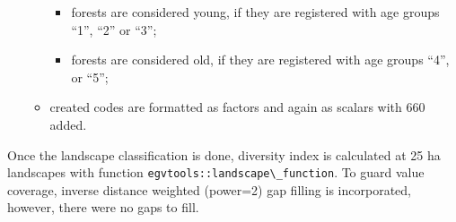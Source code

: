 \documentclass[
]{book}
\newcommand{\passthrough}[1]{#1}
\begin{document}
\begin{itemize}
\begin{itemize}
    \begin{itemize}
    \item
      forests are considered young, if they are registered with age groups
      ``1'', ``2'' or ``3'';
    \item
      forests are considered old, if they are registered with age groups
      ``4'', or ``5'';
    \end{itemize}
  \item
    created codes are formatted as factors and again as scalars with 660 added.
  \end{itemize}
\end{itemize}

Once the landscape classification is done, diversity index is calculated at 25 ha
landscapes with function \passthrough{\lstinline!egvtools::landscape\_function!}. To guard value coverage,
inverse distance weighted (power=2) gap filling is incorporated, however,
there were no gaps to fill.
\end{document}
